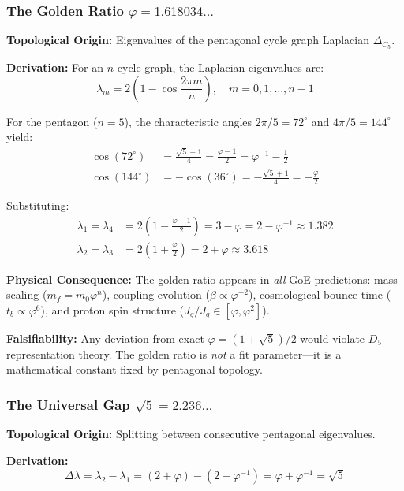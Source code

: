 \documentclass[12pt]{article}
\theoremstyle{definition}
\theoremstyle{plain}
\begin{document}
\subsubsection{The Golden Ratio $\varphi = 1.618034\ldots$}

\textbf{Topological Origin:} Eigenvalues of the pentagonal cycle graph Laplacian $\Delta_{C_5}$.

\textbf{Derivation:} For an $n$-cycle graph, the Laplacian eigenvalues are:
\begin{equation}
\lambda_m = 2\left(1 - \cos\frac{2\pi m}{n}\right), \quad m = 0, 1, \ldots, n-1
\end{equation}

For the pentagon ($n=5$), the characteristic angles $2\pi/5 = 72^\circ$ and $4\pi/5 = 144^\circ$ yield:
\begin{align}
\cos(72^\circ) &= \frac{\sqrt{5} - 1}{4} = \frac{\varphi - 1}{2} = \varphi^{-1} - \frac{1}{2} \\
\cos(144^\circ) &= -\cos(36^\circ) = -\frac{\sqrt{5} + 1}{4} = -\frac{\varphi}{2}
\end{align}

Substituting:
\begin{align}
\lambda_1 = \lambda_4 &= 2\left(1 - \frac{\varphi - 1}{2}\right) = 3 - \varphi = 2 - \varphi^{-1} \approx 1.382 \\
\lambda_2 = \lambda_3 &= 2\left(1 + \frac{\varphi}{2}\right) = 2 + \varphi \approx 3.618
\end{align}

\textbf{Physical Consequence:} The golden ratio appears in \textit{all} GoE predictions: mass scaling ($m_f = m_0 \varphi^n$), coupling evolution ($\beta \propto \varphi^{-2}$), cosmological bounce time ($t_b \propto \varphi^6$), and proton spin structure ($J_g/J_q \in [\varphi, \varphi^2]$).

\textbf{Falsifiability:} Any deviation from exact $\varphi = (1+\sqrt{5})/2$ would violate $D_5$ representation theory. The golden ratio is \textit{not} a fit parameter—it is a mathematical constant fixed by pentagonal topology.

\subsubsection{The Universal Gap $\sqrt{5} = 2.236\ldots$}

\textbf{Topological Origin:} Splitting between consecutive pentagonal eigenvalues.

\textbf{Derivation:}
\begin{equation}
\Delta\lambda = \lambda_2 - \lambda_1 = (2 + \varphi) - (2 - \varphi^{-1}) = \varphi + \varphi^{-1} = \sqrt{5}
\end{equation}
\end{document}
